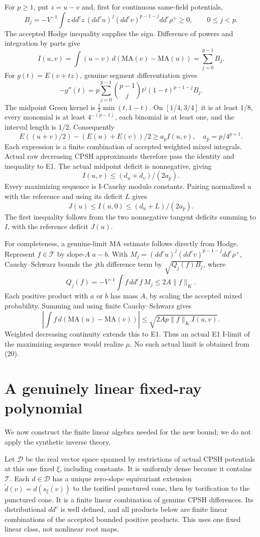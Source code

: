 \documentclass[
  10pt,
]{article}
\begin{document}
For \(p\ge1\), put \(z=u-v\) and, first for continuous same-field
potentials,
\[ B_j=-V^{-1}\int z\,dd^cz\,(dd^cu)^j(dd^cv)^{p-1-j}dd^c\rho^+\ge0,
 \qquad 0\le j<p. \tag{17}\] The accepted Hodge inequality supplies the
sign. Difference of powers and integration by parts give
\[ I(u,v)=\int(u-v)\,d(\mathrm{MA}(v)-\mathrm{MA}(u))=\sum_{j=0}^{p-1}B_j. \tag{18}\]
For \(g(t)=E(v+tz)\), genuine segment differentiation gives
\[-g''(t)=p\sum_{j=0}^{p-1}{p-1\choose j}t^j(1-t)^{p-1-j}B_j.\] The
midpoint Green kernel is \(\frac12\min(t,1-t)\). On \([1/4,3/4]\) it is
at least \(1/8\), every monomial is at least \(4^{-(p-1)}\), each
binomial is at least one, and the interval length is \(1/2\).
Consequently
\[E((u+v)/2)-(E(u)+E(v))/2\ge a_p I(u,v),\quad a_p=p/4^{p+1}. \tag{19}\]
Each expression is a finite combination of accepted weighted mixed
integrals. Actual raw decreasing CPSH approximants therefore pass the
identity and inequality to E1. The actual midpoint deficit is
nonnegative, giving \[ I(u,v)\le(d_u+d_v)/(2a_p). \tag{20}\] Every
maximizing sequence is I-Cauchy modulo constants. Pairing normalized
\(u\) with the reference and using its deficit \(L\) gives
\[ J(u)\le I(u,0)\le(d_u+L)/(2a_p). \tag{21}\] The first inequality
follows from the two nonnegative tangent deficits summing to \(I\), with
the reference deficit \(J(u)\).

For completeness, a genuine-limit MA estimate follows directly from
Hodge. Represent \(f\in\mathcal T\) by slope-\(A\) \(a-b\). With
\(M_j=(dd^cu)^j(dd^cv)^{p-1-j}dd^c\rho^+\), Cauchy--Schwarz bounds the
\(j\)th difference term by \(\sqrt{Q_j(f)B_j}\), where
\[Q_j(f)=-V^{-1}\int f\,dd^cf\,M_j\le2A\|f\|_K.\] Each positive product
with \(a\) or \(b\) has mass \(A\), by scaling the accepted mixed
probability. Summing and using finite Cauchy--Schwarz gives
\[ |\int f\,d(\mathrm{MA}(u)-\mathrm{MA}(v))|
 \le\sqrt{2Ap\|f\|_K I(u,v)}. \tag{22}\] Weighted decreasing continuity
extends this to E1. Thus an actual E1 I-limit of the maximizing sequence
would realize \(\mu\). No such actual limit is obtained from (20).

\section{A genuinely linear fixed-ray
polynomial}\label{a-genuinely-linear-fixed-ray-polynomial}

We now construct the finite linear algebra needed for the new bound; we
do not apply the synthetic inverse theory.

Let \(\mathcal D\) be the real vector space spanned by restrictions of
actual CPSH potentials at this one fixed \(\xi\), including constants.
It is uniformly dense because it contains \(\mathcal T\). Each
\(d\in\mathcal D\) has a unique zero-slope equivariant extension
\(\widetilde d(v)=d(s_\xi(v))\) to the torified punctured cone, then by
torification to the punctured cone. It is a finite linear combination of
genuine CPSH differences. Its distributional \(dd^c\) is well defined,
and all products below are finite linear combinations of the accepted
bounded positive products. This uses one fixed linear class, not
nonlinear root maps.
\end{document}
